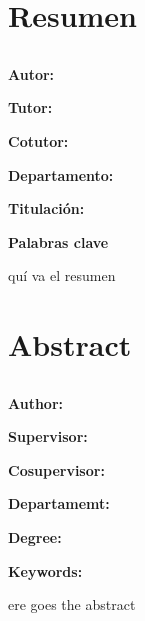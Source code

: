 \chapter*{Resumen}

\section*{\Large \textsf{\tfeTitle}}

\begin{flushleft}
    \textbf{Autor:} \tfeAuthor
    
    \textbf{Tutor:} \tfeTutor
    
    \textbf{Cotutor:} \tfeCotutor
    
    \textbf{Departamento:} \tfeDepartment
    
    \textbf{Titulación:} \tfeDegree
    
    \textbf{Palabras clave} \tfeKeywords
    
\end{flushleft}

\vspace{1cm}
\begin{SingleSpace}

quí va el resumen

\end{SingleSpace}


\cleardoublepage

\chapter*{Abstract}

\section*{\Large \textsf{\tfeTitle}}

\begin{flushleft}
    \textbf{Author:} \tfeAuthor
    
    \textbf{Supervisor:} \tfeTutor
    
    \textbf{Cosupervisor:} \tfeCotutor
    
    \textbf{Departamemt:} \tfeDepartment
    
    \textbf{Degree:} \tfeDegree
    
    \textbf{Keywords:} \tfeKeywords 
\end{flushleft}

\vspace{1cm}
\begin{SingleSpace}

ere goes the abstract

\end{SingleSpace}

